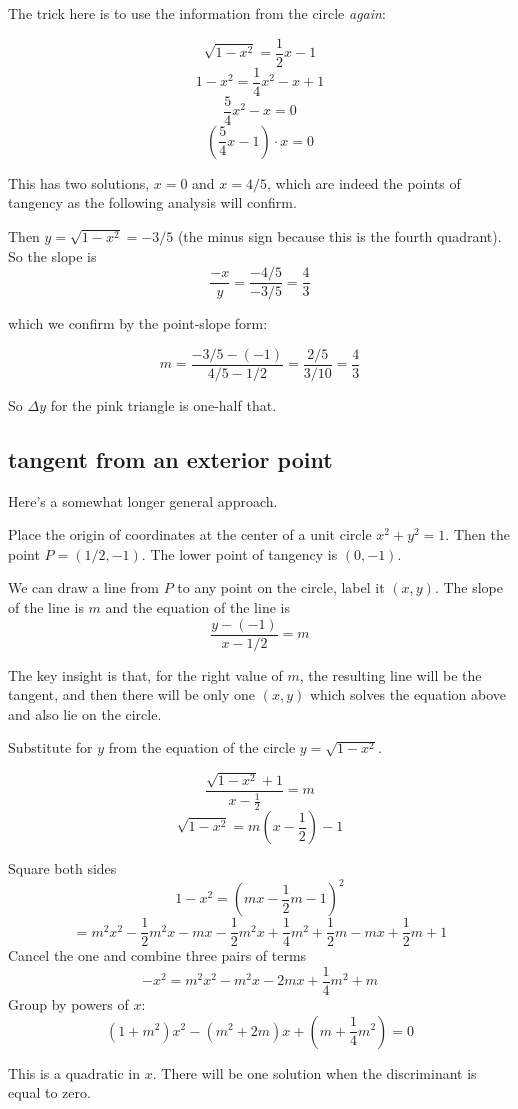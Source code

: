\documentclass[11pt, oneside]{article}
\begin{document}
The trick here is to use the information from the circle \emph{again}:

\[ \sqrt{1 - x^2} = \frac{1}{2} x - 1 \]
\[ 1 - x^2 = \frac{1}{4}x^2 - x + 1 \]
\[ \frac{5}{4}x^2 - x = 0 \]
\[ (\frac{5}{4}x - 1) \cdot x = 0 \]

This has two solutions, $x = 0$ and $x = 4/5$, which are indeed the points of tangency as the following analysis will confirm.

Then $y = \sqrt{1 - x^2} = -3/5$ (the minus sign because this is the fourth quadrant).  So the slope is 
\[ \frac{-x}{y} = \frac{-4/5}{-3/5} = \frac{4}{3} \]

which we confirm by the point-slope form:

\[ m = \frac{-3/5 - (-1)}{4/5 - 1/2} = \frac{2/5}{3/10} = \frac{4}{3} \]

So $\Delta y$ for the pink triangle is one-half that.

\subsection*{tangent from an exterior point}

Here's a somewhat longer general approach.

Place the origin of coordinates at the center of a unit circle $x^2 + y^2 = 1$.  Then the point $P = (1/2,-1)$.  The lower point of tangency is $(0,-1)$.

We can draw a line from $P$ to any point on the circle, label it $(x,y)$.  The slope of the line
is $m$ and the equation of the line is
\[ \frac{y - (-1)}{x - 1/2} = m \]

The key insight is that, for the right value of $m$, the resulting line will be the tangent, and then there will be only one $(x,y)$ which solves the equation above and also lie on the circle.  

Substitute for $y$ from the equation of the circle $y = \sqrt{1 - x^2}$.

\[ \frac{\sqrt{1 - x^2} + 1}{x - \frac{1}{2}} = m \]
\[ \sqrt{1 - x^2} = m(x - \frac{1}{2}) - 1 \]

Square both sides
\[ 1 - x^2 = (mx - \frac{1}{2}m - 1)^2 \]
\[ = m^2 x^2 - \frac{1}{2}m^2x - mx - \frac{1}{2}m^2x +  \frac{1}{4}m^2 + \frac{1}{2}m - mx + \frac{1}{2}m + 1   \]
Cancel the one and combine three pairs of terms
\[ -  x^2 = m^2 x^2 - m^2x - 2mx  +  \frac{1}{4}m^2 + m   \]
Group by powers of $x$:
\[ (1 + m^2)x^2 - (m^2 + 2m)x + (m + \frac{1}{4}m^2)  = 0 \]

This is a quadratic in $x$.  There will be one solution when the discriminant is equal to zero.
\end{document}

